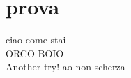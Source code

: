 \documentclass{article}
\begin{document}
    \section{prova}
        ciao come stai\\
        ORCO BOIO\\
        Another try! ao non scherza
\end{document}
